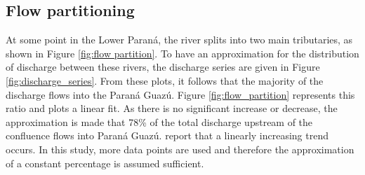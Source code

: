 \subsection{Flow partitioning}

At some point in the Lower Paraná, the river splits into two main tributaries, as shown in Figure \ref{fig:flow partition}. To have an approximation for the distribution of discharge between these rivers, the discharge series are given in Figure \ref{fig:discharge_series}. From these plots, it follows that the majority of the discharge flows into the Paraná Guazú. Figure \ref{fig:flow_partition} represents this ratio and plots a linear fit. As there is no significant increase or decrease, the approximation is made that 78\% of the total discharge upstream of the confluence flows into Paraná Guazú. \citeauthor{reMETODOLOGIAPARAGENERACION2009} report that a linearly increasing trend occurs. In this study, more data points are used and therefore the approximation of a constant percentage is assumed sufficient. 

